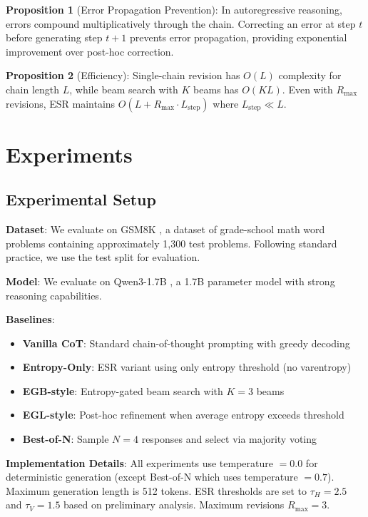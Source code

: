\documentclass{article}
\begin{document}
\textbf{Proposition 1} (Error Propagation Prevention): In autoregressive reasoning, errors compound multiplicatively through the chain. Correcting an error at step $t$ before generating step $t+1$ prevents error propagation, providing exponential improvement over post-hoc correction.

\textbf{Proposition 2} (Efficiency): Single-chain revision has $O(L)$ complexity for chain length $L$, while beam search with $K$ beams has $O(KL)$. Even with $R_{\max}$ revisions, ESR maintains $O(L + R_{\max} \cdot L_{\text{step}})$ where $L_{\text{step}} \ll L$.

\section{Experiments}
\label{sec:experiments}

\subsection{Experimental Setup}

\textbf{Dataset}: We evaluate on GSM8K \citep{cobbe2021training}, a dataset of grade-school math word problems containing approximately 1,300 test problems. Following standard practice, we use the test split for evaluation.

\textbf{Model}: We evaluate on Qwen3-1.7B \citep{yang2025qwen3}, a 1.7B parameter model with strong reasoning capabilities.

\textbf{Baselines}:
\begin{itemize}
    \item \textbf{Vanilla CoT}: Standard chain-of-thought prompting with greedy decoding
    \item \textbf{Entropy-Only}: ESR variant using only entropy threshold (no varentropy)
    \item \textbf{EGB-style}: Entropy-gated beam search with $K=3$ beams
    \item \textbf{EGL-style}: Post-hoc refinement when average entropy exceeds threshold
    \item \textbf{Best-of-N}: Sample $N=4$ responses and select via majority voting
\end{itemize}

\textbf{Implementation Details}: All experiments use temperature $=0.0$ for deterministic generation (except Best-of-N which uses temperature $=0.7$). Maximum generation length is 512 tokens. ESR thresholds are set to $\tau_H=2.5$ and $\tau_V=1.5$ based on preliminary analysis. Maximum revisions $R_{\max}=3$.
\end{document}
